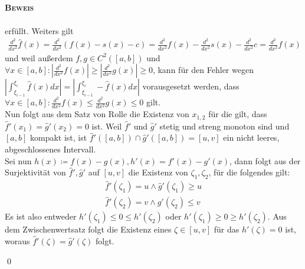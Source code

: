 \documentclass[12pt,a4paper]{scrartcl}
\numberwithin{equation}{section}
\numberwithin{myalgctr}{section}
\numberwithin{mytheoremctr}{subsection}
\numberwithin{mykorollarctr}{subsection}
\numberwithin{mylemmactr}{subsection}
\numberwithin{mybeispielctr}{subsection}
\newenvironment{myproof}{%
	\bigskip\noindent%
	\textsc{\textbf{\\Beweis\\}}%
	\indent
}{\qed\par\bigskip}  %
\begin{document}
\begin{myproof}
\begin{align*}
		\end{align*}
		erf\"ullt. Weiters gilt
		\begin{align*}
		\frac{d^2}{dx^2}\hat{f}(x) = \frac{d^2}{dx^2} (f(x) - s(x) - c) = \frac{d^2}{dx^2}f(x) - \frac{d^2}{dx^2}s(x) - \frac{d^2}{dx^2}c= \frac{d^2}{dx^2}f(x)
		\end{align*}
		und weil au\ss erdem $f,g\in C^2([a,b])$ und $\forall x \in [a,b]:|\frac{d^2}{dx^2}f(x)| \geq |\frac{d^2}{dx^2}g(x)| \geq 0$, kann f\"ur den Fehler wegen $\left|\int_{\xi_{i-1}}^{\xi_i}\hat{f}(x)dx\right| = \left|\int_{\xi_{i-1}}^{\xi_i}-\hat{f}(x)dx\right|$ vorausgesetzt werden, dass $\forall x\in [a,b]:\frac{d^2}{dx^2}f(x) \leq \frac{d^2}{dx^2}g(x) \leq 0$ gilt.\\
		Nun folgt aus dem Satz von Rolle die Existenz von $x_{1,2}$ f\"ur die gilt, dass $\hat{f}'(x_1) = \hat{g}'(x_2) = 0$ ist. Weil $\hat{f}'$ und $\hat{g}'$ stetig und streng monoton sind und $[a,b]$ kompakt ist, ist $\hat{f}'([a,b])\cap \hat{g}'([a,b]) = [u,v]$ ein nicht leeres, abgeschlossenes Intervall. \\
		Sei nun $h(x)\coloneqq f(x)-g(x),h'(x)= f'(x)-g'(x)$, dann folgt aus der Surjektivit\"at von $\hat{f}',\hat{g}'$ auf $[u,v]$ die Existenz von $\zeta_1,\zeta_2$, f\"ur die folgendes gilt:
		\begin{align*}
			\hat{f}'(\zeta_1) = u \land \hat{g}'(\zeta_1) \geq u\\
			\hat{f}'(\zeta_2) = v \land \hat{g}'(\zeta_2) \leq v
		\end{align*}
		Es ist also entweder $h'(\zeta_1) \leq 0\leq h'(\zeta_2)$ oder $h'(\zeta_1) \geq 0\geq h'(\zeta_2)$. Aus dem Zwischenwertsatz folgt die Existenz eines $\zeta\in [u,v]$ f\"ur das $h'(\zeta) =0$ ist, woraus $\hat{f}'(\zeta) = \hat{g}'(\zeta)$ folgt. 
		

\end{myproof}
\end{document}
